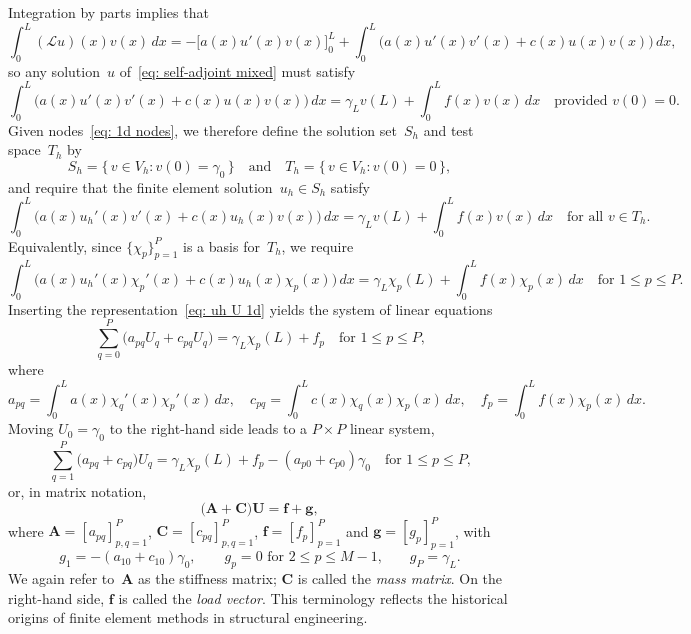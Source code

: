 Integration by parts implies that
\begin{equation}\label{eq: Lu v by parts}
\int_0^L(\mathcal{L}u)(x)v(x)\,dx
    =-\bigl[a(x)u'(x)v(x)\bigr]_0^L+\int_0^L\bigl(a(x)u'(x)v'(x)+c(x)u(x)v(x)
        \bigr)\,dx,
\end{equation}
so any solution~$u$ of~\eqref{eq: self-adjoint mixed} must satisfy
\begin{equation}\label{eq: Lu=f weak 1d}
\int_0^L\bigl(a(x)u'(x)v'(x)+c(x)u(x)v(x)\bigr)\,dx
    =\gamma_Lv(L)+\int_0^Lf(x)v(x)\,dx
    \quad\text{provided $v(0)=0$.}
\end{equation}
Given nodes~\eqref{eq: 1d nodes}, we therefore define the solution set~$S_h$ 
and test space~$T_h$ by
\[
S_h=\{\,v\in V_h:v(0)=\gamma_0\,\}
\quad\text{and}\quad
T_h=\{\,v\in V_h:v(0)=0\,\},
\]
and require that the finite element solution~$u_h\in S_h$ satisfy
\begin{equation}\label{eq: self-adjoint mixed bc FEM}
\int_0^L\bigl(a(x)u_h'(x)v'(x)+c(x)u_h(x)v(x)\bigr)\,dx
    =\gamma_Lv(L)+\int_0^Lf(x)v(x)\,dx
    \quad\text{for all $v\in T_h$.}
\end{equation}
Equivalently, since $\{\chi_p\}_{p=1}^P$ is a basis for~$T_h$, we require
\[
\int_0^L\bigl(a(x)u_h'(x)\chi_p'(x)+c(x)u_h(x)\chi_p(x)\bigr)\,dx
    =\gamma_L\chi_p(L)+\int_0^Lf(x)\chi_p(x)\,dx
    \quad\text{for $1\le p\le P$.}
\]
Inserting the representation~\eqref{eq: uh U 1d} yields the system of linear 
equations
\begin{equation}\label{eq: self-adjoint 1D linear system}
\sum_{q=0}^P\bigl(a_{pq}U_q+c_{pq}U_q\bigr)=\gamma_L\chi_p(L)+f_p
    \quad\text{for $1\le p\le P$,}
\end{equation}
where
\[
a_{pq}=\int_0^La(x)\chi_q'(x)\chi_p'(x)\,dx,\quad
c_{pq}=\int_0^Lc(x)\chi_q(x)\chi_p(x)\,dx,\quad
f_p=\int_0^Lf(x)\chi_p(x)\,dx.
\]
Moving $U_0=\gamma_0$ to the right-hand side leads to a $P\times P$ linear 
system,
\[
\sum_{q=1}^P\bigl(a_{pq}+c_{pq})U_q
    =\gamma_L\chi_p(L)+f_p-(a_{p0}+c_{p0})\gamma_0
    \quad\text{for $1\le p\le P$,}
\]
or, in matrix notation,
\begin{equation}\label{eq: self-adjoint mixed equations}
\bigl(\boldsymbol{A}+\boldsymbol{C}\bigr)\boldsymbol{U}
    =\boldsymbol{f}+\boldsymbol{g},
\end{equation}
where $\boldsymbol{A}=[a_{pq}]_{p,q=1}^P$, $\boldsymbol{C}=[c_{pq}]_{p,q=1}^P$,
$\boldsymbol{f}=[f_p]_{p=1}^P$ and $\boldsymbol{g}=[g_p]_{p=1}^P$, with
\[
g_1=-(a_{10}+c_{10})\gamma_0,\qquad
\text{$g_p=0$ for $2\le p\le M-1$,}\qquad
g_P=\gamma_L.
\]
We again refer to~$\boldsymbol{A}$ as the stiffness matrix;
$\boldsymbol{C}$ is called the \emph{mass matrix}.  On the right-hand side, 
$\boldsymbol{f}$ is called the \emph{load vector}.  This terminology reflects 
the historical origins of finite element methods in structural engineering.

